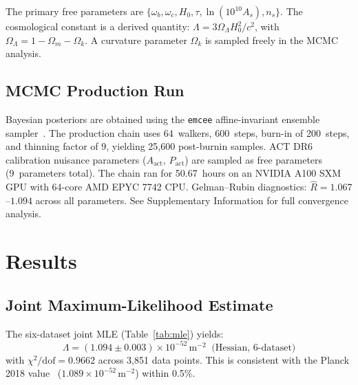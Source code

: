 \documentclass[12pt,a4paper]{article}
\newcommand{\OmL}{\Omega_\Lambda}
\newcommand{\Omm}{\Omega_m}
\newcommand{\msq}{\,\mathrm{m}^{-2}}
\begin{document}
The primary free parameters are
$\{\omega_b, \omega_c, H_0, \tau, \ln(10^{10}A_s), n_s\}$.
The cosmological constant is a derived quantity:
$\Lambda = 3\OmL H_0^2/c^2$, with $\OmL = 1 - \Omm - \Omega_k$.
A curvature parameter $\Omega_k$ is sampled freely in the MCMC analysis.

\subsection{MCMC Production Run}

Bayesian posteriors are obtained using the \texttt{emcee}
affine-invariant ensemble sampler~\cite{ForemanMackey2013}.
The production chain uses 64~walkers, 600~steps, burn-in of 200~steps,
and thinning factor of 9, yielding 25,600 post-burnin samples.
ACT DR6 calibration nuisance parameters ($A_\mathrm{act}$, $P_\mathrm{act}$)
are sampled as free parameters (9~parameters total).
The chain ran for 50.67~hours on an NVIDIA A100 SXM GPU
with 64-core AMD EPYC 7742 CPU.
Gelman--Rubin diagnostics: $\hat{R} = 1.067$--$1.094$ across all parameters.
See Supplementary Information for full convergence analysis.

\section{Results}

\subsection{Joint Maximum-Likelihood Estimate}

The six-dataset joint MLE (Table~\ref{tab:mle}) yields:
\begin{equation}
\boxed{\Lambda = (1.094 \pm 0.003)\times 10^{-52}\msq \;\;\text{(Hessian, 6-dataset)}}
\label{eq:Lambda_mle}
\end{equation}
with $\chi^2/\mathrm{dof} = 0.9662$ across 3,851 data points.
This is consistent with the Planck 2018 value~\cite{Planck2020}
($1.089 \times 10^{-52}\msq$) within 0.5\%.
\end{document}
